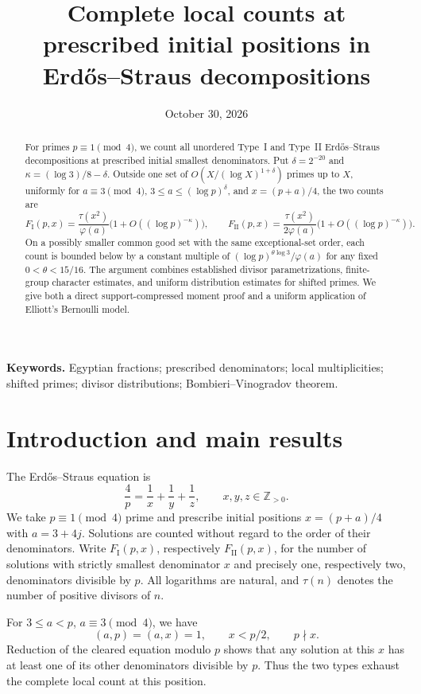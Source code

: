 \documentclass[11pt]{article}
\title{Complete local counts at prescribed initial positions\newline
in Erd\H{o}s--Straus decompositions}
\author{}
\date{October 30, 2026}
\theoremstyle{remark}\newtheorem{remark}[theorem]{Remark}
\newcommand{\FI}{F_{\mathrm I}}
\newcommand{\FII}{F_{\mathrm {II}}}
\begin{document}
\maketitle
\begin{abstract}
For primes $p\equiv1\pmod4$, we count all unordered Type~I and Type~II
Erd\H{o}s--Straus decompositions at prescribed initial smallest
denominators. Put $\delta=2^{-20}$ and $\kappa=(\log3)/8-\delta$.
Outside one set of $O(X/(\log X)^{1+\delta})$ primes up to $X$,
uniformly for $a\equiv3\pmod4$, $3\le a\le(\log p)^\delta$, and
$x=(p+a)/4$, the two counts are
\[
 \FI(p,x)=\frac{\tau(x^2)}{\varphi(a)}
      \bigl(1+O((\log p)^{-\kappa})\bigr),\qquad
 \FII(p,x)=\frac{\tau(x^2)}{2\varphi(a)}
      \bigl(1+O((\log p)^{-\kappa})\bigr).
\]
On a possibly smaller common good set with the same exceptional-set
order, each count is bounded below by a constant multiple of
$(\log p)^{\theta\log3}/\varphi(a)$ for any fixed
$0<\theta<15/16$. The argument combines established divisor
parametrizations, finite-group character estimates, and uniform
distribution estimates for shifted primes. We give both a direct
support-compressed moment proof and a uniform application of Elliott's
Bernoulli model.
\end{abstract}
\noindent\textbf{Keywords.} Egyptian fractions; prescribed denominators;
local multiplicities; shifted primes; divisor distributions;
Bombieri--Vinogradov theorem.

\section{Introduction and main results}
The Erd\H{o}s--Straus equation is
\begin{equation}\label{eq:es}
 \frac4p=\frac1x+\frac1y+\frac1z,
 \qquad x,y,z\in\mathbb Z_{>0}.
\end{equation}
We take $p\equiv1\pmod4$ prime and prescribe initial positions
$x=(p+a)/4$ with $a=3+4j$. Solutions are counted without regard to the
order of their denominators. Write $\FI(p,x)$, respectively
$\FII(p,x)$, for the number of solutions with strictly smallest
denominator $x$ and precisely one, respectively two, denominators
divisible by $p$. All logarithms are natural, and $\tau(n)$ denotes the
number of positive divisors of $n$.

For $3\le a<p$, $a\equiv3\pmod4$, we have
\[
 (a,p)=(a,x)=1,\qquad x<p/2,\qquad p\nmid x.
\]
Reduction of the cleared equation modulo $p$ shows that any solution
at this $x$ has at least one of its other denominators divisible by $p$.
Thus the two types exhaust the complete local count at this position.
\end{document}
